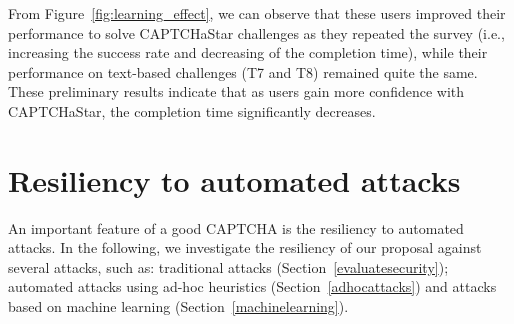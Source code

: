 \documentclass[conference]{IEEEtran}
\begin{document}
From Figure~\ref{fig:learning_effect}, we can observe that these users improved their performance to solve CAPTCHaStar challenges as they repeated the survey (i.e., increasing the success rate and decreasing of the completion time), while their performance on text-based challenges (T7 and T8) remained quite the same.
These preliminary results indicate that as users gain more confidence with CAPTCHaStar, the completion time significantly decreases.



\section{Resiliency to automated attacks}
\label{evaluateresiliency}
An important feature of a good CAPTCHA is the resiliency to automated attacks.
In the following, we investigate the resiliency of our proposal against several attacks, such as:
traditional attacks (Section~\ref{evaluatesecurity}); automated attacks using ad-hoc heuristics (Section~\ref{adhocattacks}) and attacks based on machine learning (Section~\ref{machinelearning}). 
\end{document}
